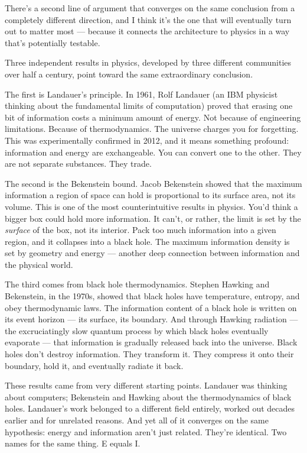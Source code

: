 \documentclass[11pt, twoside, openright]{book}
\begin{document}
There's a second line of argument that converges on the same conclusion from a completely different direction, and I think it's the one that will eventually turn out to matter most --- because it connects the architecture to physics in a way that's potentially testable.

Three independent results in physics, developed by three different communities over half a century, point toward the same extraordinary conclusion.

The first is Landauer's principle. In 1961, Rolf Landauer (an IBM physicist thinking about the fundamental limits of computation) proved that erasing one bit of information costs a minimum amount of energy. Not because of engineering limitations. Because of thermodynamics. The universe charges you for forgetting. This was experimentally confirmed in 2012, and it means something profound: information and energy are exchangeable. You can convert one to the other. They are not separate substances. They trade.

The second is the Bekenstein bound. Jacob Bekenstein showed that the maximum information a region of space can hold is proportional to its surface area, not its volume. This is one of the most counterintuitive results in physics. You'd think a bigger box could hold more information. It can't, or rather, the limit is set by the \textit{surface} of the box, not its interior. Pack too much information into a given region, and it collapses into a black hole. The maximum information density is set by geometry and energy --- another deep connection between information and the physical world.

The third comes from black hole thermodynamics. Stephen Hawking and Bekenstein, in the 1970s, showed that black holes have temperature, entropy, and obey thermodynamic laws. The information content of a black hole is written on its event horizon --- its surface, its boundary. And through Hawking radiation --- the excruciatingly slow quantum process by which black holes eventually evaporate --- that information is gradually released back into the universe. Black holes don't destroy information. They transform it. They compress it onto their boundary, hold it, and eventually radiate it back.

These results came from very different starting points. Landauer was thinking about computers; Bekenstein and Hawking about the thermodynamics of black holes. Landauer's work belonged to a different field entirely, worked out decades earlier and for unrelated reasons. And yet all of it converges on the same hypothesis: energy and information aren't just related. They're identical. Two names for the same thing. E equals I.
\end{document}
